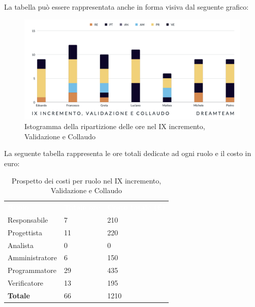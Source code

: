 La tabella può essere rappresentata anche in forma visiva dal seguente grafico:
\begin{figure}[H]
\centering
\includegraphics[scale=0.55]{Sezioni/SezioniPreventivo/grafici/Preventivo_validazione_collaudo_IX.png}
\caption{Istogramma della ripartizione delle ore nel IX incremento, Validazione e Collaudo}
\end{figure}

La seguente tabella rappresenta le ore totali dedicate ad ogni ruolo e il costo in euro:

\begin{table}[H]
\begin{center}
\renewcommand{\arraystretch}{1.5}
\begin{tabular}{ m{}<{\centering}  m{}<{\centering} m{}<{\centering}}
	\rowcolor{darkblue}
	\textcolor{white}{\textbf{Ruolo}}&\textcolor{white}{\textbf{Totale ore}}&\textcolor{white}{\textbf{Costo totale (\euro)}}\\ 

	Responsabile  & 7 & 210 \\	
	
	Progettista & 11 & 220 \\
	
	Analista & 0 & 0 \\

	Amministratore & 6 & 150 \\
	
	Programmatore & 29 & 435 \\
	
	Verificatore & 13 & 195 \\
	
	\textbf{Totale} & 66 & 1210 \\
	
\end{tabular}
\caption{Prospetto dei costi per ruolo nel IX incremento, Validazione e Collaudo}
\end{center}
\end{table}

